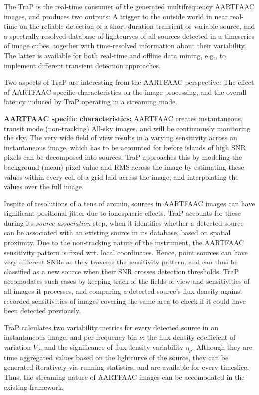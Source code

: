 \documentclass{ws-jai}
\begin{document}
The  TraP is  the real-time  consumer of  the generated  multifrequency AARTFAAC
images,  and produces  two  outputs: A  trigger  to the  outside  world in  near
real-time on  the reliable detection  of a short-duration transient  or variable
source,  and  a spectrally  resolved  database  of  lightcurves of  all  sources
detected in a timeseries of image cubes, together with time-resolved information
about their variability.  The latter is available for both real-time and offline
data mining, e.g., to implement different transient detection approaches.

Two aspects of TraP are interesting from the AARTFAAC perspective: The effect of
AARTFAAC  specific characteristics  on  the image  processing,  and the  overall
latency induced by TraP operating in a streaming mode.

\noindent   \textbf  {AARTFAAC   specific  characteristics:}   AARTFAAC  creates
instantaneous,  transit   mode  (non-tracking)  All-sky  images,   and  will  be
continuously  monitoring the  sky. The  very  wide field  of view  results in  a
varying sensitivity across an instantaneous image, which has to be accounted for
before  islands  of high  SNR  pixels  can  be  decomposed into  sources.   TraP
approaches this by modeling the background (mean) pixel value and RMS across the
image by  estimating these values  within every cell of  a grid laid  across the
image, and interpolating the values over  the full image.

Inspite of resolutions of a tens of  arcmin, sources in AARTFAAC images can have
significant positional  jitter due  to ionospheric  effects.  TraP  accounts for
these during its \textit{source association}  step, when it identifies whether a
detected source can be associated with an existing source in its database, based
on spatial  proximity.  Due to  the non-tracking  nature of the  instrument, the
AARTFAAC  sensitivity pattern  is fixed  wrt.  local  coordinates. Hence,  point
sources can have  very different SNRs as they traverse  the sensitivity pattern,
and can  thus be  classified as a  new source when  their SNR  crosses detection
thresholds. TraP accomodates  such cases by keeping track  of the fields-of-view
and sensitivities of all images it  processes, and comparing a detected source's
flux density against recorded sensitivities of  images covering the same area to
check if it could have been detected previously.

TraP  calculates  two  variability  metrics  for every  detected  source  in  an
instantaneous image, and  per frequency bin $\nu$: the  flux density coefficient
of  variation  $V_{\nu}$,  and  the significance  of  flux  density  variability
$\eta_{\nu}$. Although they are time  aggregated values based on the lightcurve
of the source, they can be generated iteratively via running statistics, and are
available for  every timeslice.  Thus,  the streaming nature of  AARTFAAC images
can be accomodated in the existing framework.
\end{document}
